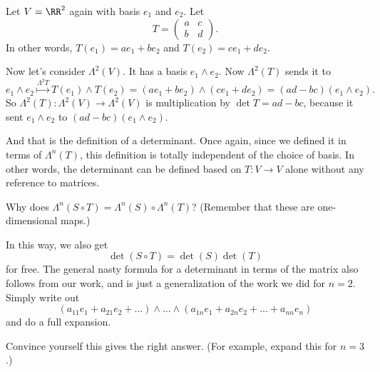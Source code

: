 \begin{example}
	Let $V = \RR^2$ again with basis $e_1$ and $e_2$.
	Let
	\[ T = \left(
		\begin{array}{cc}
			a & c \\ b & d
		\end{array}
		\right).
	\]
	In other words, $T(e_1) = ae_1 + be_2$ and $T(e_2) = ce_1 + de_2$.

	Now let's consider $\Lambda^2(V)$.
	It has a basis $e_1 \wedge e_2$.
	Now $\Lambda^2(T)$ sends it to
	\[ e_1 \wedge e_2 \overset{\Lambda^2{T}}{\longmapsto} T(e_1) \wedge T(e_2) =
		(ae_1 + be_2) \wedge (ce_1 + de_2) 
		= (ad-bc)(e_1 \wedge e_2). 
	\]
	So $\Lambda^2(T) : \Lambda^2(V) \to \Lambda^2(V)$
	is multiplication by $\det T = ad-bc$,
	because it sent $e_1 \wedge e_2$ to $(ad-bc)(e_1 \wedge e_2)$.
\end{example}
And that is the definition of a determinant.
Once again, since we defined it in terms of $\Lambda^n(T)$,
this definition is totally independent of the choice of basis.
In other words, the determinant can be defined based on $T : V \to V$ alone
without any reference to matrices.

\begin{ques}
	Why does $\Lambda^n(S \circ T) = \Lambda^n(S) \circ \Lambda^n(T)$?
	(Remember that these are one-dimensional maps.)
\end{ques}
In this way, we also get \[ \det(S \circ T) = \det(S) \det(T) \] for free.
The general nasty formula for a determinant in terms of the matrix also follows from our work,
and is just a generalization of the work we did for $n=2$.
Simply write out
\[ \left( a_{11}e_1 + a_{21}e_2 + \dots \right) \wedge \dots \wedge
	\left( a_{1n}e_1 + a_{2n}e_2 + \dots + a_{nn} e_n \right)
\]
and do a full expansion.
\begin{exercise}
	Convince yourself this gives the right answer.
	(For example, expand this for $n=3$.)
\end{exercise}

